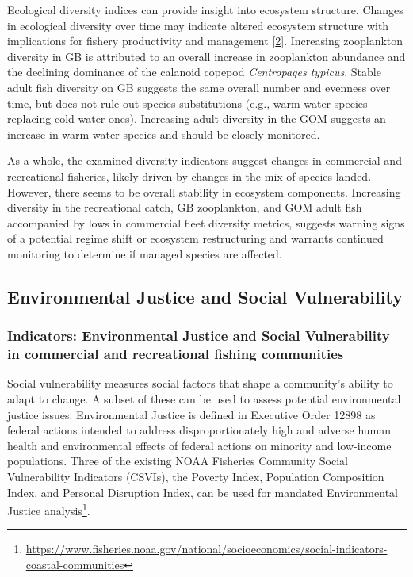 \documentclass[
  10pt,
]{article}
\begin{document}
Ecological diversity indices can provide insight into ecosystem structure. Changes in ecological diversity over time may indicate altered ecosystem structure with implications for fishery productivity and management {[}\protect\hyperlink{ref-friedland_changes_2020}{2}{]}. Increasing zooplankton diversity in GB is attributed to an overall increase in zooplankton abundance and the declining dominance of the calanoid copepod \emph{Centropages typicus}. Stable adult fish diversity on GB suggests the same overall number and evenness over time, but does not rule out species substitutions (e.g., warm-water species replacing cold-water ones). Increasing adult diversity in the GOM suggests an increase in warm-water species and should be closely monitored.

As a whole, the examined diversity indicators suggest changes in commercial and recreational fisheries, likely driven by changes in the mix of species landed. However, there seems to be overall stability in ecosystem components. Increasing diversity in the recreational catch, GB zooplankton, and GOM adult fish accompanied by lows in commercial fleet diversity metrics, suggests warning signs of a potential regime shift or ecosystem restructuring and warrants continued monitoring to determine if managed species are affected.

\hypertarget{environmental-justice-and-social-vulnerability}{%
\subsection{Environmental Justice and Social Vulnerability}\label{environmental-justice-and-social-vulnerability}}

\hypertarget{indicators-environmental-justice-and-social-vulnerability-in-commercial-and-recreational-fishing-communities}{%
\subsubsection{Indicators: Environmental Justice and Social Vulnerability in commercial and recreational fishing communities}\label{indicators-environmental-justice-and-social-vulnerability-in-commercial-and-recreational-fishing-communities}}

Social vulnerability measures social factors that shape a community's ability to adapt to change. A subset of these can be used to assess potential environmental justice issues. Environmental Justice is defined in Executive Order 12898 as federal actions intended to address disproportionately high and adverse human health and environmental effects of federal actions on minority and low-income populations. Three of the existing NOAA Fisheries Community Social Vulnerability Indicators (CSVIs), the Poverty Index, Population Composition Index, and Personal Disruption Index, can be used for mandated Environmental Justice analysis\footnote{\url{https://www.fisheries.noaa.gov/national/socioeconomics/social-indicators-coastal-communities}}.
\end{document}
